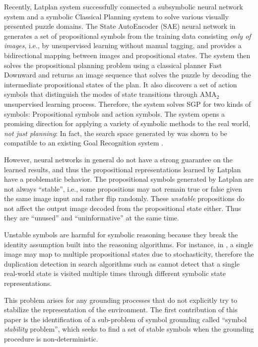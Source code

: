 Recently, Latplan system \cite[]{Asai2018} successfully
connected a subsymbolic neural network system and a symbolic Classical Planning system
to solve various visually presented puzzle domains.
The State AutoEncoder (SAE) neural network in \latentplanner
generates a set of propositional symbols from the training data consisting \emph{only of images},
i.e., by unsupervised learning without manual tagging,
and provides a bidirectional mapping between images and propositional states.
% 
The system then solves the propositional planning problem using a classical planner Fast Downward \cite{Helmert04}
and returns an image sequence that solves the puzzle
by decoding the intermediate propositional states of the plan.
It also discovers a set of action symbols that distinguish the modes of
state transitions through AMA$_2$ unsupervised learning process.
Therefore, the system solves SGP for two kinds of symbols:
Propositional symbols and action symbols.
% 
The system opens a promising direction for
applying a variety of symbolic methods to the real world, \emph{not just planning}:
In fact, the search space generated by \latentplanner was shown to be compatible
to an existing Goal Recognition system \cite{amado2018goal}.

However,
neural networks in general do not have a strong guarantee on the learned results,
and thus the propositional representations learned by Latplan have a problematic behavior.
The propositional symbols generated by Latplan are not always
``stable'', i.e., some propositions may not remain true or false given the same image input
and rather flip randomly.
These \emph{unstable} propositions do not affect the output image decoded from the propositional state either.
Thus they are ``unused'' and ``uninformative'' at the same time.

Unstable symbols are harmful for symbolic reasoning because
they break the identity assumption built into the reasoning algorithms.
For instance, in \latentplanner, 
a single image may map to multiple propositional states due to stochasticity,
therefore the duplication detection in search algorithms such as \astar \cite{hart1968formal}
cannot detect that a single real-world state is visited multiple times through
different symbolic state representations.

This problem arises for any grounding processes that do not explicitly try to stabilize the
representation of the environment.
The first contribution of this paper is the identification of a sub-problem of symbol grounding
called ``symbol \emph{stability} problem'', which seeks to find a set of stable symbols
when the grounding procedure is non-deterministic.

